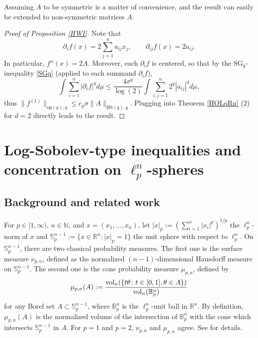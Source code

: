 \documentclass[a4paper,12pt]{amsart}
\numberwithin{equation}{section}
\theoremstyle{remark}
\def\R{{\mathbb R}}
\def\N{{\mathbb N}}
\def\S{{\mathbb S}}
\def\vol{{\rm vol}}
\begin{document}
Assuming $A$ to be symmetric is a matter of convenience, and the result can easily be extended to non-symmetric matrices $A$.

\begin{proof}[Proof of Proposition \ref{HWI}]
    Note that
    \[
    \partial_i f(x) = 2\sum_{j=1}^n a_{ij}x_j, \qquad \partial_{ij} f(x) = 2a_{ij}.
    \]
    In particular, $f''(x) = 2A$. Moreover, each $\partial_i f$ is centered, so that by the $\mathrm{SG}_q$-inequality \eqref{SGq} (applied to each summand $\partial_i f$),
    \[
    \int \sum_{i=1} ^n |\partial_i f|^q d\mu \le \frac{4\sigma^q}{\log(2)} \int \sum_{i,j=1}^n 2^q|a_{ij}|^q d\mu,
    \]
    thus $\lVert f^{(1)} \rVert_{\mathrm{op}(q),q} \le c_p \sigma \lVert A \rVert_{\mathrm{HS}(q),q}$. Plugging into Theorem \ref{HOLqRn} (2) for $d=2$ directly leads to the result.
\end{proof}

\section{Log-Sobolev-type inequalities and concentration on \texorpdfstring{$\ell_p^n$}{l\_p\^n}-spheres}\label{LSISphSec}

\subsection{Background and related work}\label{RelWork}
For $p \in [1,\infty)$, $n \in \N$, and $x=(x_1,\ldots,x_n)$, let $\lvert x \rvert_p := (\sum_{i=1}^n |x_i|^p)^{1/p}$ the $\ell_p^n$-norm of $x$ and $\S_p^{n-1} := \{ x \in \R^n \colon \lvert x \rvert_p = 1\}$ the unit sphere with respect to $\ell_p^n$. On $\S_p^{n-1}$, there are two classical probability measures. The first one is the surface measure $\nu_{p,n}$, defined as the normalized $(n-1)$-dimensional Hausdorff measure on $\S_p^{n-1}$. The second one is the cone probability measure $\mu_{p,n}$, defined by
\[
\mu_{p,n}(A) := \frac{\vol_n(\{t\theta \colon t \in [0,1], \theta \in A\})}{\vol_n(\mathbb{B}_p^n)}
\]
for any Borel set $A \subset \S_p^{n-1}$, where $\mathbb{B}_p^n$ is the $\ell_p^n$-unit ball in $\R^n$. By definition, $\mu_{p,n}(A)$ is the normalized volume of the intersection of $\mathbb{B}_p^n$ with the cone which intersects $\S_p^{n-1}$ in $A$. For $p=1$ and $p=2$, $\nu_{p,n}$ and $\mu_{p,n}$ agree. See \cite[Sect.\ 9.3.1]{PTT19} for details.
\end{document}
